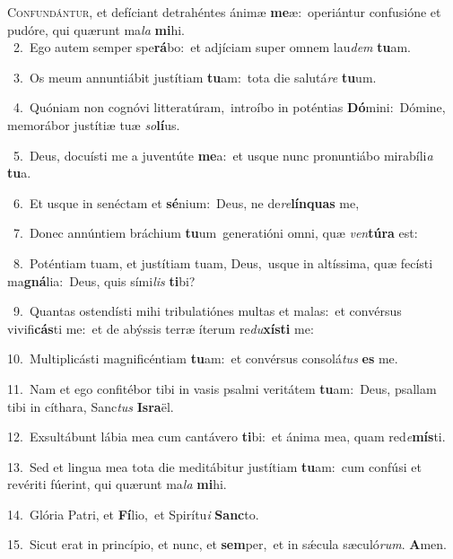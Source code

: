 \lettrine{\initial\textcolor{\initialcolor}{C}}{onfundántur,} et defíciant detrahéntes ánimæ \textbf{me}\-æ:~\star operiántur confusióne et pudóre, qui quærunt ma\textit{la} \textbf{mi}\-hi.\\
{\numbfont\textcolor{\numbcolor}{~2.}}~Ego autem semper spe\-\textbf{rá}\-bo:~\star et adjíciam super omnem lau\textit{dem} \textbf{tu}\-am.\par
{\numbfont\textcolor{\numbcolor}{~3.}}~Os meum annuntiábit justítiam \textbf{tu}\-am:~\star tota die salutá\textit{re} \textbf{tu}\-um.\par
{\numbfont\textcolor{\numbcolor}{~4.}}~Quóniam non cognóvi litteratúram,~\dagger introíbo in poténtias \textbf{Dó}\-mini:~\star Dómine, memorábor justítiæ tuæ \textit{so}\-\textbf{lí}us.\par
{\numbfont\textcolor{\numbcolor}{~5.}}~Deus, docuísti me a juventúte \textbf{me}\-a:~\star et usque nunc pronuntiábo mirabíli\textit{a} \textbf{tu}\-a.\par
{\numbfont\textcolor{\numbcolor}{~6.}}~Et usque in senéctam et \textbf{sé}\-nium:~\star Deus, ne de\-\textit{re}\-\textbf{lín}\textbf{quas} me,\par
{\numbfont\textcolor{\numbcolor}{~7.}}~Donec annúntiem bráchium \textbf{tu}\-um~\star generatióni omni, quæ \textit{ven}\-\textbf{tú}\textbf{ra} est:\par
{\numbfont\textcolor{\numbcolor}{~8.}}~Poténtiam tuam, et justítiam tuam, Deus,~\dagger usque in altíssima, quæ fecísti ma\-\textbf{gná}\-lia:~\star Deus, quis sími\textit{lis} \textbf{ti}\-bi?\par
{\numbfont\textcolor{\numbcolor}{~9.}}~Quantas ostendísti mihi tribulatiónes multas et malas:~\dagger et convérsus vivifi\-\textbf{cás}\-ti me:~\star et de abýssis terræ íterum re\-\textit{du}\-\textbf{xís}\textbf{ti} me:\par
{\numbfont\textcolor{\numbcolor}{10.}}~Multiplicásti magnificéntiam \textbf{tu}\-am:~\star et convérsus consolá\textit{tus} \textbf{es} me.\par
{\numbfont\textcolor{\numbcolor}{11.}}~Nam et ego confitébor tibi in vasis psalmi veritátem \textbf{tu}\-am:~\star Deus, psallam tibi in cíthara, Sanc\textit{tus} \textbf{Is}\-\textbf{ra}ël.\par
{\numbfont\textcolor{\numbcolor}{12.}}~Exsultábunt lábia mea cum cantávero \textbf{ti}\-bi:~\star et ánima mea, quam red\-\textit{e}\-\textbf{mís}ti.\par
{\numbfont\textcolor{\numbcolor}{13.}}~Sed et lingua mea tota die meditábitur justítiam \textbf{tu}\-am:~\star cum confúsi et revériti fúerint, qui quærunt ma\textit{la} \textbf{mi}\-hi.\par
{\numbfont\textcolor{\numbcolor}{14.}}~Glória Patri, et \textbf{Fí}\-lio,~\star et Spirítu\textit{i} \textbf{Sanc}\-to.\par
{\numbfont\textcolor{\numbcolor}{15.}}~Sicut erat in princípio, et nunc, et \textbf{sem}\-per,~\star et in sǽcula sæculó\-\textit{rum}\-. \textbf{A}\-men.\par
